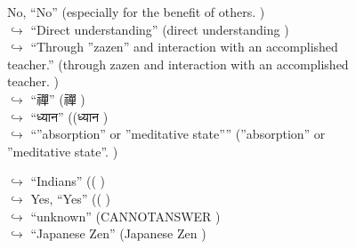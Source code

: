 \documentclass[11pt,a4paper, onecolumn]{article}
\begin{document}
\begin{figure}[t]
\begin{tcolorbox}[boxsep=0pt,left=5pt,right=0pt,top=2pt,colback = yellow!5]
\begin{dialogue}
\colorbox{red!25}{No,}
{ ``No'' (especially for the benefit of others. ) }
\\
\colorbox{pink!25}{$\hookrightarrow$}
{ ``Direct understanding'' (direct understanding ) }
\\
\colorbox{pink!25}{$\hookrightarrow$}
{ ``Through ''zazen'' and interaction with an accomplished teacher.'' (through zazen and interaction with an accomplished teacher. ) }
\\
\colorbox{pink!25}{$\hookrightarrow$}
{ ``禪'' (禪 ) }
\\
\colorbox{pink!25}{$\hookrightarrow$}
{ ``ध्यान'' ((ध्यान ) }
\\
\colorbox{pink!25}{$\hookrightarrow$}
{ ``''absorption'' or ''meditative state'''' (''absorption'' or ''meditative state''. ) }
 \end{dialogue}\end{tcolorbox}\end{figure}\begin{figure}[t] \small \begin{tcolorbox}[boxsep=0pt,left=5pt,right=0pt,top=2pt,colback = yellow!5] \begin{dialogue}
 \small 
\colorbox{pink!25}{$\hookrightarrow$}
{ ``Indians'' (( ) }
\\
\colorbox{pink!25}{$\hookrightarrow$}
\colorbox{red!25}{Yes,}
{ ``Yes'' (( ) }
\\
\colorbox{pink!25}{$\hookrightarrow$}
{ ``unknown'' (CANNOTANSWER ) }
\\
\colorbox{pink!25}{$\hookrightarrow$}
{ ``Japanese Zen'' (Japanese Zen ) }
\\
 \end{dialogue}\end{tcolorbox}\end{figure}
\end{document}
